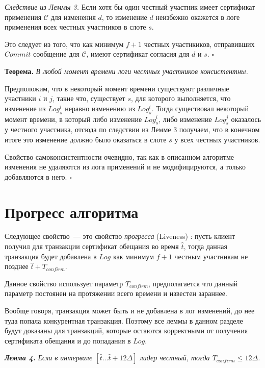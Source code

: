 \textit{Следствие из Леммы 3.} Если хотя бы один честный участник имеет сертификат применения $\mathcal{C}$ для изменения $d$, то  изменение $d$ неизбежно окажется в логе применения всех честных участников в слоте $s$. 

Это следует из того, что как минимум $f+1$ честных участнкиков, отправивших $Commit$ сообщение для $\mathcal{C}$, имеют сертификат согласия для $d$ и $s$. $\square$
\vspace{10pt}

\textbf{Теорема.} \textit{В любой момент времени логи честных участников консистентны.}

Предположим, что в некоторый момент времени существуют различные участники $i$ и $j$, такие что, существует $s$, для которого выполняется, что изменение из $Log^i_s$ неравно изменению из $Log^i_s$. Тогда существовал некоторый момент времени, в который либо изменение $Log^i_s$, либо изменение $Log^j_s$ оказалось у честного участника, отсюда по следствии из Лемме 3 получаем, что в конечном итоге это изменение должно было оказаться в слоте $s$ у всех честных участников.

Свойство самоконсистентности очевидно, так как в описанном алгоритме изменения не удаляются из лога применений и не модифицируются, а только добавляются в него. $\square$

\section{Прогресс алгоритма}
\noindent Следующее свойство~--- это свойство \textit{прогресса} (Liveness) \cite{hybrid-consensus}:
пусть клиент получил для транзакции сертификат обещания во время $\hat{t}$, тогда данная транзакция будет добавлена в $Log$ как минимум $f+1$ честным участникам не позднее $\hat{t} + T_{confirm}$.

Данное свойство использует параметр $T_{confirm}$, предполагается что данный параметр постоянен на протяжении всего времени и известен зараннее.

Вообще говоря, транзакция может быть и не добавлена в лог изменений, до нее туда попала конкурентная транзакция. Поэтому все леммы в данном разделе будут доказаны для транзакций, которые остаются корректными от получения сертификата обещания и до попадания в $Log$.
\vspace{10pt}

\textbf{\textit{Лемма 4.}} \textit{Если в интервале $[\hat{t}...\hat{t}+12\Delta]$ лидер честный, тогда $T_{confirm} \le 12\Delta$.}

